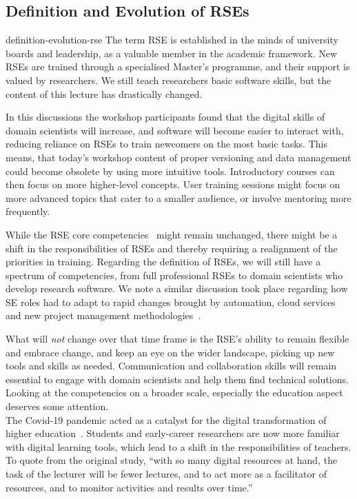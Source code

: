 \documentclass{eceasst}
\begin{document}
\subsection{Definition and Evolution of RSEs}
\begin{whatis}{}{definition-evolution-rse}
The term RSE is established in the minds of university boards and leadership, as a valuable member in the academic framework.
New RSEs are trained through a specialised Master's programme, and their support is valued by researchers.
We still teach researchers basic software skills, but the content of this lecture has drastically changed.
\end{whatis}
In this discussions the workshop participants found that
the digital skills of domain scientists will increase,
and software will become easier to interact with,
reducing reliance on RSEs to train newcomers on the most basic tasks.
This means, that today's workshop content of proper versioning
and data management could become obsolete by using more intuitive tools.
Introductory courses can then focus on more higher-level concepts.
User training sessions might focus on more advanced topics
that cater to a smaller audience, or involve mentoring more frequently.

While the RSE core competencies~\cite{Goth2024} might remain unchanged,
there might be a shift in the responsibilities of RSEs and thereby requiring a realignment of the priorities in training.
Regarding the definition of RSEs, we will still have a spectrum of competencies,
from full professional RSEs to domain scientists who develop research software.
We note a similar discussion took place regarding how SE roles had to adapt to
rapid changes brought by automation, cloud services and new project management
methodologies~\cite{Meade2019}.

What will \emph{not} change over that time frame is the RSE's ability to remain
flexible and embrace change, and keep an eye on the wider landscape,
picking up new tools and skills as needed.
Communication and collaboration skills will remain essential to engage
with domain scientists and help them find technical solutions.\\

Looking at the competencies on a broader scale, especially the education aspect deserves some attention.\\
The Covid-19 pandemic acted as a catalyst for the digital transformation
of higher education~\cite{Bygstad2022}. Students and early-career researchers
are now more familiar with digital learning tools, which lead to a shift
in the responsibilities of teachers. To quote from the original study,
``with so many digital resources at hand,
the task of the lecturer will be fewer lectures,
and to act more as a facilitator of resources,
and to monitor activities and results over time.''~\cite{Bygstad2022}
\end{document}
